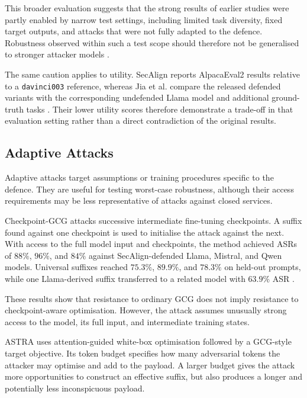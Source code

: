 This broader evaluation suggests that the strong results of earlier studies
were partly enabled by narrow test settings, including limited task diversity,
fixed target outputs, and attacks that were not fully adapted to the defence.
Robustness observed within such a test scope should therefore not be
generalised to stronger attacker models
\parencite{jia2025critical}.

The same caution applies to utility. SecAlign reports AlpacaEval2 results
relative to a \texttt{davinci003} reference, whereas Jia et al. compare the
released defended variants with the corresponding undefended Llama model and
additional ground-truth tasks
\parencites{chen2025secalign}{jia2025critical}. Their lower utility scores
therefore demonstrate a trade-off in that evaluation setting rather than a
direct contradiction of the original results.

\subsection{Adaptive Attacks}
\label{subsec:adaptive-attacks}

Adaptive attacks target assumptions or training procedures specific to the
defence. They are useful for testing worst-case robustness, although their
access requirements may be less representative of attacks against closed
services.

Checkpoint-GCG attacks successive intermediate fine-tuning checkpoints. A
suffix found against one checkpoint is used to initialise the attack against
the next. With access to the full model input and checkpoints, the method
achieved ASRs of \(88\%\), \(96\%\), and \(84\%\) against SecAlign-defended
Llama, Mistral, and Qwen models. Universal suffixes reached \(75.3\%\),
\(89.9\%\), and \(78.3\%\) on held-out prompts, while one Llama-derived suffix
transferred to a related model with \(63.9\%\) ASR
\parencite{yang2025checkpointgcg}.

These results show that resistance to ordinary GCG does not imply resistance to
checkpoint-aware optimisation. However, the attack assumes unusually strong
access to the model, its full input, and intermediate training states.

ASTRA uses attention-guided white-box optimisation followed by a GCG-style
target objective. Its token budget specifies how many adversarial tokens the
attacker may optimise and add to the payload. A larger budget gives the attack
more opportunities to construct an effective suffix, but also produces a
longer and potentially less inconspicuous payload.

